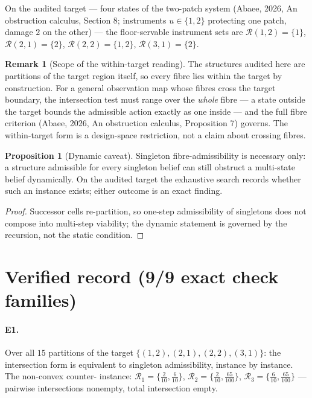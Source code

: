 \documentclass[10pt,twocolumn]{article}
\theoremstyle{definition}
\newtheorem{proposition}{Proposition}
\newtheorem{remark}{Remark}
\begin{document}
On the audited target --- four states of the two-patch system (Abaee, 2026, An obstruction calculus,
Section 8; instruments $u\in\{1,2\}$ protecting one patch, damage $2$ on
the other) --- the floor-servable instrument sets are
$\mathcal R(1,2)=\{1\}$, $\mathcal R(2,1)=\{2\}$,
$\mathcal R(2,2)=\{1,2\}$, $\mathcal R(3,1)=\{2\}$.

\begin{remark}[Scope of the within-target reading]
\label{rem:scope}
The structures audited here are partitions of the target region itself, so
every fibre lies within the target by construction. For a general
observation map whose fibres cross the target boundary, the intersection
test must range over the \emph{whole} fibre --- a state outside the target
bounds the admissible action exactly as one inside --- and the full fibre
criterion (Abaee, 2026, An obstruction calculus, Proposition 7) governs. The within-target form is
a design-space restriction, not a claim about crossing fibres.
\end{remark}

\begin{proposition}[Dynamic caveat]
Singleton fibre-admissibility is necessary only: a structure admissible for
every singleton belief can still obstruct a multi-state belief
dynamically. On the audited target the exhaustive search records whether
such an instance exists; either outcome is an exact finding.
\end{proposition}
\begin{proof}
Successor cells re-partition, so one-step admissibility of singletons does
not compose into multi-step viability; the dynamic statement is governed by
the recursion, not the static condition.
\end{proof}

\section{Verified record (9/9 exact check families)}

\paragraph{E1.} Over all $15$ partitions of the target
$\{(1,2),(2,1),(2,2),(3,1)\}$: the intersection form is equivalent to
singleton admissibility, instance by instance. The non-convex counter-
instance: $\mathcal R_1=\{\tfrac2{10},\tfrac6{10}\}$,
$\mathcal R_2=\{\tfrac2{10},\tfrac{65}{100}\}$,
$\mathcal R_3=\{\tfrac6{10},\tfrac{65}{100}\}$ --- pairwise intersections
nonempty, total intersection empty.
\end{document}
